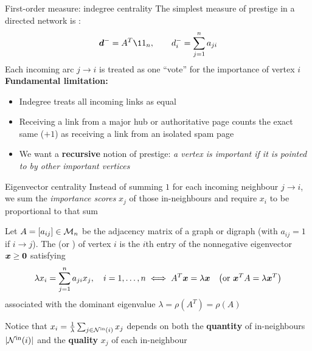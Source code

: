 \documentclass[aspectratio=169]{beamer}\usepackage[]{graphicx}\usepackage[]{xcolor}
\begin{document}
\begin{frame}{First-order measure: indegree centrality}
The simplest measure of prestige in a directed network is :
\[
\bd^- = A^T \11_n, \qquad d_i^- = \sum_{j=1}^n a_{ji}
\]
Each incoming arc $j \to i$ is treated as one ``vote'' for the importance of vertex $i$
\vfill
\textbf{Fundamental limitation:}
\begin{itemize}
\item Indegree treats all incoming links as equal
\item Receiving a link from a major hub or authoritative page counts the exact same ($+1$) as receiving a link from an isolated spam page
\item We want a \textbf{recursive} notion of prestige: \emph{a vertex is important if it is pointed to by other important vertices}
\end{itemize}
\end{frame}

\begin{frame}{Eigenvector centrality}
Instead of summing $1$ for each incoming neighbour $j \to i$, we sum the \emph{importance scores} $x_j$ of those in-neighbours and require $x_i$ to be proportional to that sum
\vfill
\begin{importantdefinition}
Let $A = [a_{ij}] \in \mathcal{M}_n$ be the adjacency matrix of a graph or digraph (with $a_{ij} = 1$ if $i \to j$). The  (or ) of vertex $i$ is the $i$th entry of the nonnegative eigenvector $\bx \ge \b0$ satisfying
\[
\lambda x_i = \sum_{j=1}^n a_{ji} x_j, \quad i=1,\ldots,n \iff A^T \bm{x} = \lambda \bm{x} \quad \bigl(\text{or } \bm{x}^T A = \lambda \bm{x}^T\bigr)
\]
associated with the dominant eigenvalue $\lambda = \rho(A^T) = \rho(A)$
\end{importantdefinition}
\vfill
Notice that $x_i = \frac{1}{\lambda}\sum_{j \in \mathcal{N}^{\text{in}}(i)} x_j$ depends on both the \textbf{quantity} of in-neighbours $|\mathcal{N}^{\text{in}}(i)|$ and the \textbf{quality} $x_j$ of each in-neighbour
\end{frame}
\end{document}
